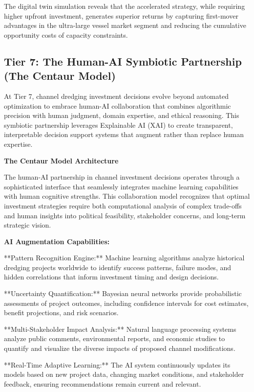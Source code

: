 \documentclass{article}
\begin{document}
The digital twin simulation reveals that the accelerated strategy, while requiring higher upfront investment, generates superior returns by capturing first-mover advantages in the ultra-large vessel market segment and reducing the cumulative opportunity costs of capacity constraints.

\subsection{Tier 7: The Human-AI Symbiotic Partnership (The Centaur Model)}

At Tier 7, channel dredging investment decisions evolve beyond automated optimization to embrace human-AI collaboration that combines algorithmic precision with human judgment, domain expertise, and ethical reasoning. This symbiotic partnership leverages Explainable AI (XAI) to create transparent, interpretable decision support systems that augment rather than replace human expertise.

\textbf{The Centaur Model Architecture}

The human-AI partnership in channel investment decisions operates through a sophisticated interface that seamlessly integrates machine learning capabilities with human cognitive strengths. This collaboration model recognizes that optimal investment strategies require both computational analysis of complex trade-offs and human insights into political feasibility, stakeholder concerns, and long-term strategic vision.

\textbf{AI Augmentation Capabilities:}

**Pattern Recognition Engine:** Machine learning algorithms analyze historical dredging projects worldwide to identify success patterns, failure modes, and hidden correlations that inform investment timing and design decisions.

**Uncertainty Quantification:** Bayesian neural networks provide probabilistic assessments of project outcomes, including confidence intervals for cost estimates, benefit projections, and risk scenarios.

**Multi-Stakeholder Impact Analysis:** Natural language processing systems analyze public comments, environmental reports, and economic studies to quantify and visualize the diverse impacts of proposed channel modifications.

**Real-Time Adaptive Learning:** The AI system continuously updates its models based on new project data, changing market conditions, and stakeholder feedback, ensuring recommendations remain current and relevant.
\end{document}
